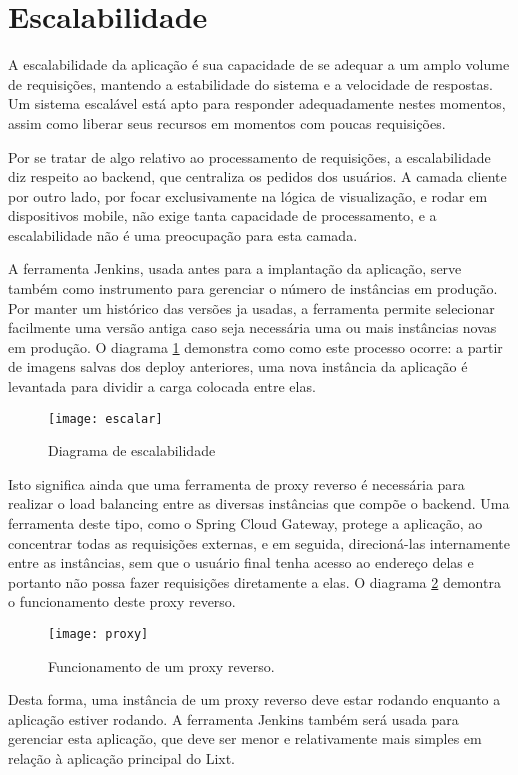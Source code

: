 \section{Escalabilidade}

A escalabilidade da aplicação é sua capacidade de se adequar a um
amplo volume de requisições, mantendo a estabilidade do sistema e a
velocidade de respostas. Um sistema escalável está apto para responder
adequadamente nestes momentos, assim como liberar seus recursos em
momentos com poucas requisições.

Por se tratar de algo relativo ao processamento de requisições, a
escalabilidade diz respeito ao \gls{backend}, que centraliza os
pedidos dos usuários. A camada cliente por outro lado, por focar
exclusivamente na lógica de visualização, e rodar em dispositivos
mobile, não exige tanta capacidade de processamento, e a
escalabilidade não é uma preocupação para esta camada.

A ferramenta Jenkins, usada antes para a implantação da aplicação,
serve também como instrumento para gerenciar o número de instâncias em
produção. Por manter um histórico das versões ja usadas, a ferramenta
permite selecionar facilmente uma versão antiga caso seja necessária
uma ou mais instâncias novas em produção. O diagrama
\ref{fig:escalabilidade} demonstra como como este processo ocorre: a
partir de imagens salvas dos \gls{deploy} anteriores, uma nova
instância da aplicação é levantada para dividir a carga colocada entre
elas.

\begin{figure}
  \centering
  \caption{Diagrama de escalabilidade}
  \label{fig:escalabilidade}
  \texttt{[image: escalar]}
\end{figure}

Isto significa ainda que uma ferramenta de \gls{proxy} reverso é necessária
para realizar o \gls{load balancing} entre as diversas instâncias que
compõe o \gls{backend}. Uma ferramenta deste tipo, como o Spring Cloud
Gateway, protege a aplicação, ao concentrar todas as requisições
externas, e em seguida, direcioná-las internamente entre as
instâncias, sem que o usuário final tenha acesso ao endereço delas e
portanto não possa fazer requisições diretamente a elas.
O diagrama \ref{fig:proxy} demontra o funcionamento deste proxy
reverso.

\begin{figure}
  \centering
  \caption{Funcionamento de um proxy reverso.}
  \label{fig:proxy}
  \texttt{[image: proxy]}
\end{figure}

Desta forma, uma instância de um proxy reverso deve estar rodando
enquanto a aplicação estiver rodando. A ferramenta Jenkins também será
usada para gerenciar esta aplicação, que deve ser menor e
relativamente mais simples em relação à aplicação principal do Lixt.

